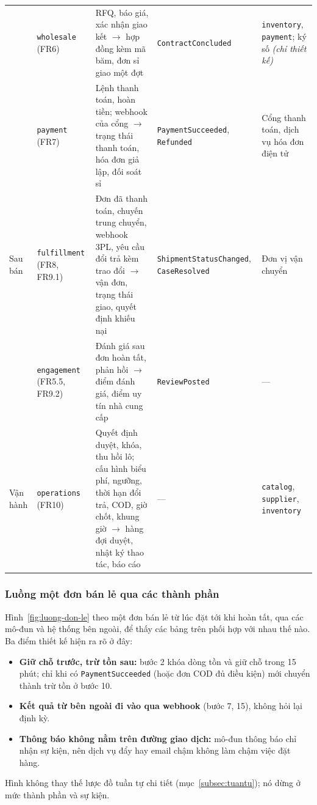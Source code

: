 \begin{longtable}{L{1.55cm} L{2.40cm} L{5.00cm} L{2.85cm} L{2.40cm}}
& \texttt{wholesale} (FR6) & RFQ, báo giá, xác nhận giao kết $\rightarrow$ hợp đồng kèm mã băm, đơn sỉ giao một đợt & \texttt{ContractConcluded} & \texttt{inventory}, \texttt{payment}; ký số \emph{(chỉ thiết kế)} \\
& \texttt{payment} (FR7) & Lệnh thanh toán, hoàn tiền; webhook của cổng $\rightarrow$ trạng thái thanh toán, hóa đơn giả lập, đối soát sỉ & \texttt{PaymentSucceeded}, \texttt{Refunded} & Cổng thanh toán, dịch vụ hóa đơn điện tử \\
Sau bán & \texttt{fulfillment} (FR8, FR9.1) & Đơn đã thanh toán, chuyến trung chuyển, webhook 3PL, yêu cầu đổi trả kèm trao đổi $\rightarrow$ vận đơn, trạng thái giao, quyết định khiếu nại & \texttt{ShipmentStatusChanged}, \texttt{CaseResolved} & Đơn vị vận chuyển \\
& \texttt{engagement} (FR5.5, FR9.2) & Đánh giá sau đơn hoàn tất, phản hồi $\rightarrow$ điểm đánh giá, điểm uy tín nhà cung cấp & \texttt{ReviewPosted} & --- \\
Vận hành & \texttt{operations} (FR10) & Quyết định duyệt, khóa, thu hồi lô; cấu hình biểu phí, ngưỡng, thời hạn đổi trả, COD, giờ chốt, khung giờ $\rightarrow$ hàng đợi duyệt, nhật ký thao tác, báo cáo & --- & \texttt{catalog}, \texttt{supplier}, \texttt{inventory} \\
\end{longtable}
\endgroup

\subsubsection*{Luồng một đơn bán lẻ qua các thành phần}

Hình~\ref{fig:luong-don-le} theo một đơn bán lẻ từ lúc đặt tới khi hoàn tất, qua các mô-đun và hệ thống bên ngoài, để thấy các bảng trên phối hợp với nhau thế nào. Ba điểm thiết kế hiện ra rõ ở đây:
\begin{itemize}
    \item \textbf{Giữ chỗ trước, trừ tồn sau:} bước 2 khóa dòng tồn và giữ chỗ trong 15 phút; chỉ khi có \texttt{PaymentSucceeded} (hoặc đơn COD đủ điều kiện) mới chuyển thành trừ tồn ở bước 10.
    \item \textbf{Kết quả từ bên ngoài đi vào qua webhook} (bước 7, 15), không hỏi lại định kỳ.
    \item \textbf{Thông báo không nằm trên đường giao dịch:} mô-đun thông báo chỉ nhận sự kiện, nên dịch vụ đẩy hay email chậm không làm chậm việc đặt hàng.
\end{itemize}
Hình không thay thế lược đồ tuần tự chi tiết (mục~\ref{subsec:tuantu}); nó dừng ở mức thành phần và sự kiện.

